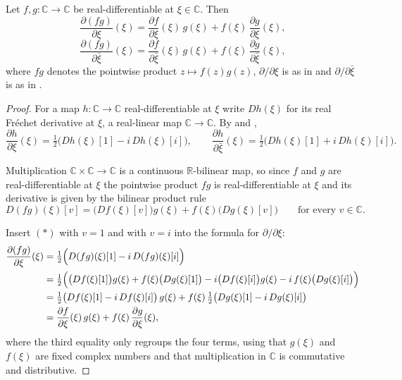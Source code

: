 \begin{lemma}
Let $f,g\colon\mathbb{C}\to\mathbb{C}$ be real-differentiable at
$\xi\in\mathbb{C}$.  Then
\[
  \frac{\partial(fg)}{\partial\xi}(\xi)
  =\frac{\partial f}{\partial\xi}(\xi)\,g(\xi)+f(\xi)\,\frac{\partial g}{\partial\xi}(\xi),
\]
\[
  \frac{\partial(fg)}{\partial\bar\xi}(\xi)
  =\frac{\partial f}{\partial\bar\xi}(\xi)\,g(\xi)+f(\xi)\,\frac{\partial g}{\partial\bar\xi}(\xi),
\]
where $fg$ denotes the pointwise product $z\mapsto f(z)g(z)$,
$\partial/\partial\xi$ is as in  and $\partial/\partial\bar\xi$ is
as in .
\end{lemma}
\begin{proof}
For a map $h\colon\mathbb{C}\to\mathbb{C}$ real-differentiable at $\xi$ write
$Dh(\xi)$ for its real Fr\'echet derivative at $\xi$, a real-linear map
$\mathbb{C}\to\mathbb{C}$.  By  and ,
\begin{equation*}
  \frac{\partial h}{\partial\xi}(\xi)=\tfrac12\bigl(Dh(\xi)[1]-i\,Dh(\xi)[i]\bigr),
  \qquad
  \frac{\partial h}{\partial\bar\xi}(\xi)=\tfrac12\bigl(Dh(\xi)[1]+i\,Dh(\xi)[i]\bigr).
\end{equation*}

Multiplication $\mathbb{C}\times\mathbb{C}\to\mathbb{C}$ is a continuous
$\mathbb{R}$-bilinear map, so since $f$ and $g$ are real-differentiable at
$\xi$ the pointwise product $fg$ is real-differentiable at $\xi$ and its
derivative is given by the bilinear product rule
\begin{equation}\tag{$*$}
  D(fg)(\xi)[v]=\bigl(Df(\xi)[v]\bigr)g(\xi)+f(\xi)\bigl(Dg(\xi)[v]\bigr)
  \qquad\text{for every }v\in\mathbb{C}.
\end{equation}

Insert $(*)$ with $v=1$ and with $v=i$ into the formula for
$\partial/\partial\xi$:
\begin{align*}
  \frac{\partial(fg)}{\partial\xi}(\xi)
  &=\tfrac12\Bigl(D(fg)(\xi)[1]-i\,D(fg)(\xi)[i]\Bigr)\\
  &=\tfrac12\Bigl(\bigl(Df(\xi)[1]\bigr)g(\xi)+f(\xi)\bigl(Dg(\xi)[1]\bigr)
      -i\bigl(Df(\xi)[i]\bigr)g(\xi)-i\,f(\xi)\bigl(Dg(\xi)[i]\bigr)\Bigr)\\
  &=\tfrac12\bigl(Df(\xi)[1]-i\,Df(\xi)[i]\bigr)\,g(\xi)
    +f(\xi)\,\tfrac12\bigl(Dg(\xi)[1]-i\,Dg(\xi)[i]\bigr)\\
  &=\frac{\partial f}{\partial\xi}(\xi)\,g(\xi)+f(\xi)\,\frac{\partial g}{\partial\xi}(\xi),
\end{align*}
where the third equality only regroups the four terms, using that $g(\xi)$ and
$f(\xi)$ are fixed complex numbers and that multiplication in $\mathbb{C}$ is
commutative and distributive.


\end{proof}
